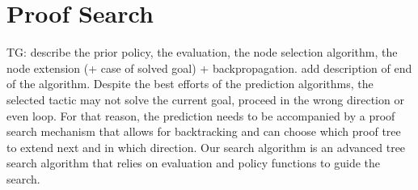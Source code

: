 \documentclass[runningheads,a4paper,draft]{svjour3}
\begin{document}
  
%
%
%
%
%
%
%
%
%



\section{Proof Search}\label{sec:proofsearch}
\todo
{
TG:
describe the prior policy, the evaluation, 
the node selection algorithm,
the node extension (+ case of solved goal) + backpropagation.
add description of end of the algorithm.
}
Despite the best efforts of the prediction algorithms, the selected tactic may 
not 
solve the current goal, proceed in the wrong direction
or even loop. For that reason, the prediction needs to be accompanied by a  
proof search mechanism that allows for backtracking and 
can choose which proof tree to extend next and in 
which direction.
Our search algorithm is an advanced tree search algorithm that relies on 
evaluation and policy functions to guide the search.
\end{document}
